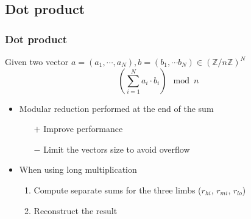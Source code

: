 \documentclass[10pt]{beamer}
\begin{document}
\subsection{Dot product}
\begin{frame}
    \frametitle{Dot product}
    Given two vector $a = (a_1,\cdots,a_N), b = (b_1,\cdots b_N) \in \left(\mathbb{Z}/n\mathbb{Z}\right)^N$
    \[
        \left(\sum^N_{i=1}a_i\cdot b_i\right) \mod n
    \]

    \medskip
    \begin{itemize}
        \item<+-> Modular reduction performed at the end of the sum
            \begin{itemize}
                \item[$+$] Improve performance
                \item[$-$] Limit the vectors size to avoid overflow
            \end{itemize}
        \item<+-> When using long multiplication
            \begin{enumerate}
                \item Compute separate sums for the three limbs ($r_{hi}$, $r_{mi}$, $r_{lo}$)
                \item Reconstruct the result
            \end{enumerate}
    \end{itemize}
\end{frame}
\end{document}
